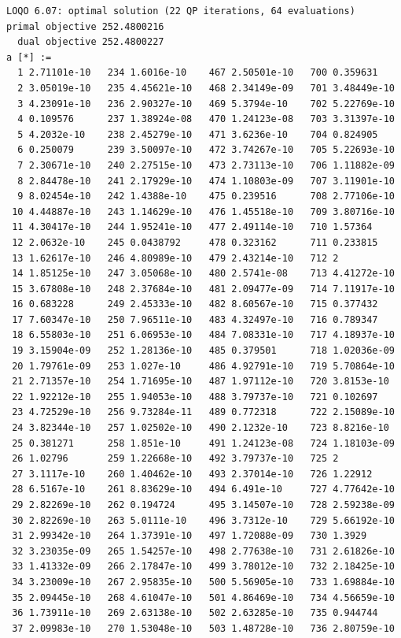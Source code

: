 \documentclass{article}
\begin{document}
\begin{verbatim}
LOQO 6.07: optimal solution (22 QP iterations, 64 evaluations)
primal objective 252.4800216
  dual objective 252.4800227
a [*] :=
  1 2.71101e-10   234 1.6016e-10    467 2.50501e-10   700 0.359631
  2 3.05019e-10   235 4.45621e-10   468 2.34149e-09   701 3.48449e-10
  3 4.23091e-10   236 2.90327e-10   469 5.3794e-10    702 5.22769e-10
  4 0.109576      237 1.38924e-08   470 1.24123e-08   703 3.31397e-10
  5 4.2032e-10    238 2.45279e-10   471 3.6236e-10    704 0.824905
  6 0.250079      239 3.50097e-10   472 3.74267e-10   705 5.22693e-10
  7 2.30671e-10   240 2.27515e-10   473 2.73113e-10   706 1.11882e-09
  8 2.84478e-10   241 2.17929e-10   474 1.10803e-09   707 3.11901e-10
  9 8.02454e-10   242 1.4388e-10    475 0.239516      708 2.77106e-10
 10 4.44887e-10   243 1.14629e-10   476 1.45518e-10   709 3.80716e-10
 11 4.30417e-10   244 1.95241e-10   477 2.49114e-10   710 1.57364
 12 2.0632e-10    245 0.0438792     478 0.323162      711 0.233815
 13 1.62617e-10   246 4.80989e-10   479 2.43214e-10   712 2
 14 1.85125e-10   247 3.05068e-10   480 2.5741e-08    713 4.41272e-10
 15 3.67808e-10   248 2.37684e-10   481 2.09477e-09   714 7.11917e-10
 16 0.683228      249 2.45333e-10   482 8.60567e-10   715 0.377432
 17 7.60347e-10   250 7.96511e-10   483 4.32497e-10   716 0.789347
 18 6.55803e-10   251 6.06953e-10   484 7.08331e-10   717 4.18937e-10
 19 3.15904e-09   252 1.28136e-10   485 0.379501      718 1.02036e-09
 20 1.79761e-09   253 1.027e-10     486 4.92791e-10   719 5.70864e-10
 21 2.71357e-10   254 1.71695e-10   487 1.97112e-10   720 3.8153e-10
 22 1.92212e-10   255 1.94053e-10   488 3.79737e-10   721 0.102697
 23 4.72529e-10   256 9.73284e-11   489 0.772318      722 2.15089e-10
 24 3.82344e-10   257 1.02502e-10   490 2.1232e-10    723 8.8216e-10
 25 0.381271      258 1.851e-10     491 1.24123e-08   724 1.18103e-09
 26 1.02796       259 1.22668e-10   492 3.79737e-10   725 2
 27 3.1117e-10    260 1.40462e-10   493 2.37014e-10   726 1.22912
 28 6.5167e-10    261 8.83629e-10   494 6.491e-10     727 4.77642e-10
 29 2.82269e-10   262 0.194724      495 3.14507e-10   728 2.59238e-09
 30 2.82269e-10   263 5.0111e-10    496 3.7312e-10    729 5.66192e-10
 31 2.99342e-10   264 1.37391e-10   497 1.72088e-09   730 1.3929
 32 3.23035e-09   265 1.54257e-10   498 2.77638e-10   731 2.61826e-10
 33 1.41332e-09   266 2.17847e-10   499 3.78012e-10   732 2.18425e-10
 34 3.23009e-10   267 2.95835e-10   500 5.56905e-10   733 1.69884e-10
 35 2.09445e-10   268 4.61047e-10   501 4.86469e-10   734 4.56659e-10
 36 1.73911e-10   269 2.63138e-10   502 2.63285e-10   735 0.944744
 37 2.09983e-10   270 1.53048e-10   503 1.48728e-10   736 2.80759e-10

\end{verbatim}
\end{document}
